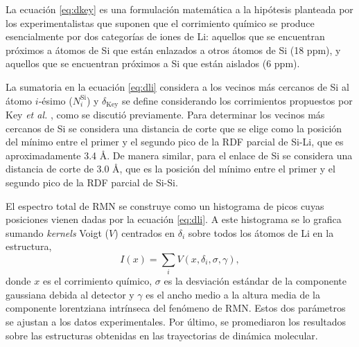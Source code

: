 La ecuación \ref{eq:dkey} es una formulación matemática a la hipótesis planteada
por los experimentalistas \cite{key2009} que suponen que el corrimiento químico 
se produce esencialmente por dos categorías de iones de Li: aquellos que se 
encuentran próximos a átomos de Si que están enlazados a otros átomos de Si (18 
ppm), y aquellos que se encuentran próximos a Si que están aislados (6 ppm).

La sumatoria en la ecuación \ref{eq:dli} considera a los vecinos más cercanos de 
Si al átomo $i$-ésimo ($N_i^{\text{Si}}$) y $\delta_{\text{Key}}$ se define 
considerando los corrimientos propuestos por Key \textit{et al.} \cite{key2009},
como se discutió previamente. Para determinar los vecinos más cercanos de Si 
se considera una distancia de corte que se elige como la posición del mínimo 
entre el primer y el segundo pico de la RDF parcial de Si-Li, que es 
aproximadamente 3.4 \AA. De manera similar, para el enlace de Si se considera una 
distancia de corte de 3.0 \AA, que es la posición del mínimo entre el primer y el 
segundo pico de la RDF parcial de Si-Si.

El espectro total de RMN se construye como un histograma de picos cuyas posiciones
vienen dadas por la ecuación \ref{eq:dli}. A este histograma se lo grafica sumando 
\textit{kernels} Voigt ($V$) centrados en $\delta_i$ sobre todos los átomos de Li
en la estructura,
\begin{equation}\label{eq:nmr}
    I(x) = \sum_{i} V(x, \delta_{i}, \sigma, \gamma),
\end{equation}
donde $x$ es el corrimiento químico, $\sigma$ es la desviación estándar de la 
componente gaussiana debida al detector y $\gamma$ es el ancho medio a la altura 
media de la componente lorentziana intrínseca del fenómeno de RMN. Estos 
dos parámetros se ajustan a los datos experimentales. Por último, se promediaron
los resultados sobre las estructuras obtenidas en las trayectorias de dinámica 
molecular.

